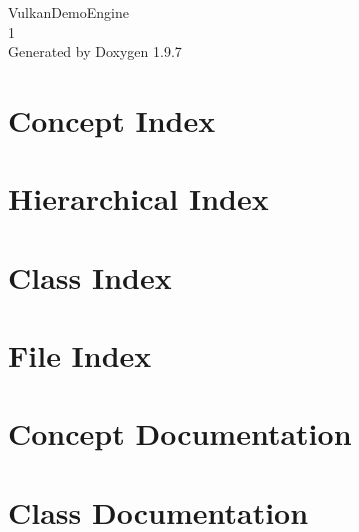 \documentclass[twoside]{book}
\newcommand{\+}{\discretionary{\mbox{\scriptsize$\hookleftarrow$}}{}{}}
\newcommand{\clearemptydoublepage}{%
    \newpage{\pagestyle{empty}\cleardoublepage}%
  }
\begin{document}
  \raggedbottom
    \hypersetup{pageanchor=false,
                bookmarksnumbered=true,
                pdfencoding=unicode
               }
  \begin{titlepage}
  \vspace*{7cm}
  \begin{center}%
  {\Large Vulkan\+Demo\+Engine}\\
  [1ex]\large 1 \\
  \vspace*{1cm}
  {\large Generated by Doxygen 1.9.7}\\
  \end{center}
  \end{titlepage}
  \clearemptydoublepage
  \tableofcontents
  \clearemptydoublepage
  \hypersetup{pageanchor=true}
\chapter{Concept Index}

\chapter{Hierarchical Index}

\chapter{Class Index}

\chapter{File Index}

\chapter{Concept Documentation}


\chapter{Class Documentation}




























\end{document}

